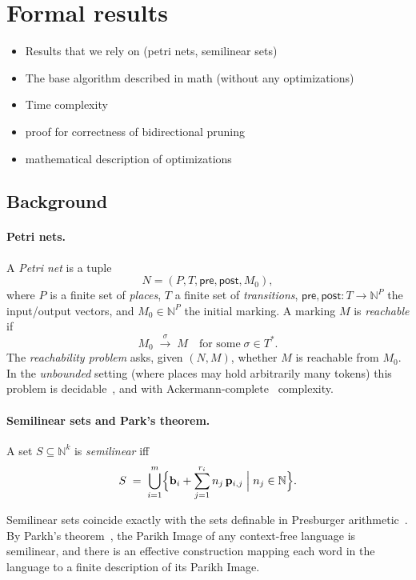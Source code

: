 \section{Formal results}
\label{sec:formal-results}

\begin{itemize}
	\item Results that we rely on (petri nets, semilinear sets)
	\item The base algorithm described in math (without any optimizations)
	\item Time complexity
	\item proof for correctness of bidirectional pruning
	\item mathematical description of optimizations
\end{itemize}


\subsection{Background}

\paragraph{Petri nets.}
A \emph{Petri net} is a tuple
\[
N = (P, T, \mathsf{pre}, \mathsf{post}, M_0),
\]
where \(P\) is a finite set of \emph{places}, \(T\) a finite set of \emph{transitions},
\(\mathsf{pre},\mathsf{post}:T\to\mathbb N^P\) the input/output vectors, and
\(M_0\in\mathbb N^P\) the initial marking.  A marking \(M\) is \emph{reachable} if
\[
M_0 \;\xrightarrow{\sigma}\; M
\quad\text{for some}\;\sigma\in T^*.
\]
%
The \emph{reachability problem} asks, given $(N,M)$, whether $M$ is reachable from $M_0$.  In the
\emph{unbounded} setting (where places may hold arbitrarily many tokens) this problem is
decidable~\cite{Ma81,Ko82,La92}, and with
Ackermann-complete~\cite{CzWo22} complexity.

\paragraph{Semilinear sets and Park’s theorem.}
A set \(S\subseteq\mathbb N^k\) is \emph{semilinear} iff
\[
S \;=\; \bigcup_{i=1}^m \Bigl\{\mathbf b_i + \sum_{j=1}^{r_i} n_j\,\mathbf p_{i,j}
\;\Big|\; n_j\in\mathbb N\Bigr\}.
\]

Semilinear sets coincide exactly with the sets definable in Presburger arithmetic~\cite{Pr29}.
%
By Parkh's theorem~\cite{Parikh66}, the Parikh Image of any context-free language is semilinear, and there is an effective construction mapping each word in the language to a
finite description of its Parikh Image.

